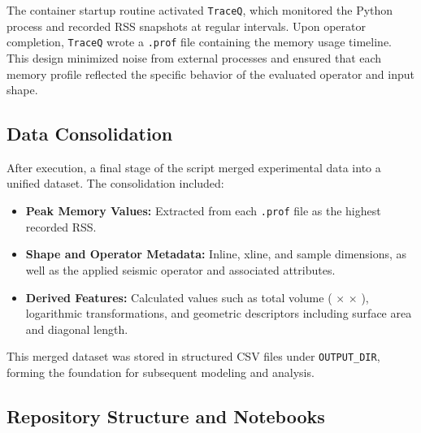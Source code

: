The container startup routine activated \texttt{TraceQ}, which monitored the Python process and recorded \ac{RSS} snapshots at regular intervals.
Upon operator completion, \texttt{TraceQ} wrote a \texttt{.prof} file containing the memory usage timeline.
This design minimized noise from external processes and ensured that each memory profile reflected the specific behavior of the evaluated operator and input shape.

\subsection{Data Consolidation}
\label{subsec:data-consolidation}

After execution, a final stage of the script merged experimental data into a unified dataset.
The consolidation included:

\begin{itemize}
    \item \textbf{Peak Memory Values:} Extracted from each \texttt{.prof} file as the highest recorded \ac{RSS}.
    \item \textbf{Shape and Operator Metadata:} Inline, xline, and sample dimensions, as well as the applied seismic operator and associated attributes.
    \item \textbf{Derived Features:} Calculated values such as total volume ( $\times$  $\times$ ), logarithmic transformations, and geometric descriptors including surface area and diagonal length.
\end{itemize}

This merged dataset was stored in structured \ac{CSV} files under \texttt{OUTPUT\_DIR}, forming the foundation for subsequent modeling and analysis.

\subsection{Repository Structure and Notebooks}
\label{subsec:repository-structure-and-notebooks}


